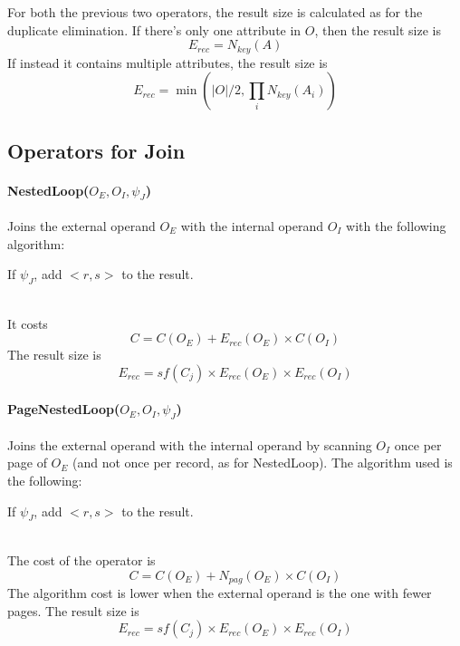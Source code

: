 For both the previous two operators, the result size is calculated as for the duplicate elimination. If there's only one attribute in $O$, then the result size is
\begin{equation*}
    E_{rec} = N_{key}(A)
\end{equation*}
If instead it contains multiple attributes, the result size is
\begin{equation*}
    E_{rec} = \min(|O|/2, \prod_i N_{key}(A_i))
\end{equation*}

\subsection{Operators for Join}

\paragraph{NestedLoop($O_E, O_I, \psi_J$)}
Joins the external operand $O_E$ with the internal operand $O_I$ with the following algorithm:
\begin{algorithm}
\begin{algorithmic}
                \State If $\psi_J$, add $<r,s>$ to the result.
            \EndIf
        \EndFor
    \EndFor
\end{algorithmic}
\end{algorithm} \\
It costs
\begin{equation*}
    C = C(O_E) + E_{rec}(O_E) \times C(O_I)
\end{equation*}
The result size is
\begin{equation*}
    E_{rec} = sf(C_j) \times E_{rec}(O_E) \times E_{rec}(O_I)
\end{equation*}

\paragraph{PageNestedLoop($O_E, O_I, \psi_J$)}
Joins the external operand with the internal operand by scanning $O_I$ once per page of $O_E$ (and not once per record, as for NestedLoop). The algorithm used is the following:
\begin{algorithm}
\begin{algorithmic}
                    \State If $\psi_J$, add $<r,s>$ to the result. 
                \EndFor
            \EndFor
        \EndFor
    \EndFor
\end{algorithmic}
\end{algorithm} \\
The cost of the operator is
\begin{equation*}
    C = C(O_E) + N_{pag}(O_E) \times C(O_I)
\end{equation*}
The algorithm cost is lower when the external operand is the one with fewer pages.
The result size is
\begin{equation*}
    E_{rec} = sf(C_j) \times E_{rec}(O_E) \times E_{rec}(O_I)
\end{equation*}

